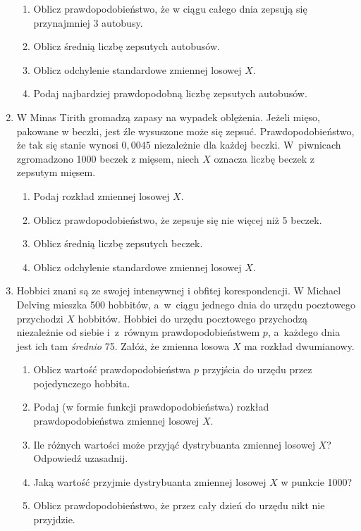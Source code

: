 \documentclass{mwart}
\newcommand{\ans}[1]{}
\begin{document}
\begin{enumerate}
\begin{enumerate}
\item Oblicz prawdopodobieństwo, że w ciągu całego dnia zepsują się przynajmniej 3 autobusy.
\item Oblicz średnią liczbę zepsutych autobusów.
\item Oblicz odchylenie standardowe zmiennej losowej $X$.
\item Podaj najbardziej prawdopodobną liczbę zepsutych autobusów. \ans{$(n+1)p-1=1, (n+1)p=2$}
\end{enumerate}
\item W Minas Tirith gromadzą zapasy na wypadek oblężenia. Jeżeli mięso,
pakowane w beczki, jest źle wysuszone może się zepsuć. Prawdopodobieństwo, że
tak się stanie wynosi $0{,}0045$ niezależnie dla każdej beczki. W~piwnicach zgromadzono 1000 beczek z mięsem,
niech $X$ oznacza liczbę beczek z zepsutym mięsem.  \begin{enumerate}
\item Podaj rozkład zmiennej losowej $X$. \ans{$P(X=k)={1000\choose k}p^k(1-p)^{1000-k}\approx\frac{\lambda^k}{k!}e^{-\lambda} \quad \lambda=1000\cdot0{,}0045=4{,}5$}
\item Oblicz prawdopodobieństwo, że zepsuje się nie więcej niż 5 beczek. \ans{$P(X\leq 5)=0{,}70290$}
\item Oblicz średnią liczbę zepsutych beczek. \ans{$EX=4{,}5$}
\item Oblicz odchylenie standardowe zmiennej losowej $X$. \ans{$DX=\sqrt{4{,}5}$}
\end{enumerate}
\item Hobbici znani są ze swojej intensywnej i obfitej korespondencji. W Michael
Delving mieszka 500 hobbitów, a~w~ciągu jednego dnia do urzędu pocztowego
przychodzi $X$ hobbitów. Hobbici do urzędu pocztowego przychodzą niezależnie od
siebie i~z~równym prawdopodobieństwem $p$, a~każdego dnia jest ich tam
\emph{średnio} 75. Załóż, że zmienna losowa $X$ ma rozkład dwumianowy.
\begin{enumerate}
\item Oblicz wartość prawdopodobieństwa $p$ przyjścia do urzędu przez pojedynczego hobbita.
\item Podaj  (w formie funkcji prawdopodobieństwa) rozkład prawdopodobieństwa zmiennej losowej $X$.
\item Ile różnych wartości może przyjąć dystrybuanta zmiennej losowej $X$? Odpowiedź uzasadnij.
\item Jaką wartość przyjmie dystrybuanta zmiennej losowej $X$ w punkcie 1000?
\item Oblicz prawdopodobieństwo, że przez cały dzień do urzędu nikt nie przyjdzie.

\end{enumerate}
\end{enumerate}
\end{document}
